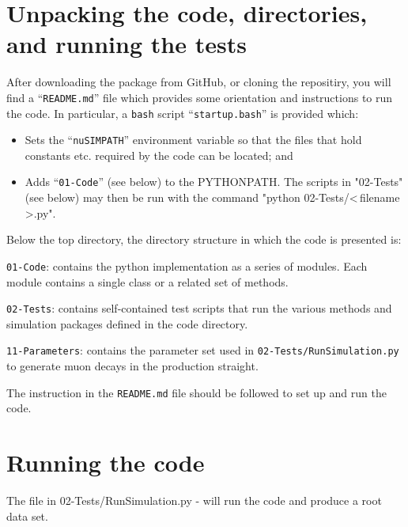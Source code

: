 \section*{Unpacking the code, directories, and running the tests}
After downloading the package from GitHub, or cloning the repositiry,
you will find a ``\verb+README.md+'' file which provides some orientation
and instructions to run the code.
In particular, a \verb+bash+ script ``\verb+startup.bash+'' is
provided which:
\begin{itemize}
  \item Sets the ``\verb+nuSIMPATH+'' environment variable so that the
    files that hold constants etc. required by the code can be
    located; and
  \item Adds ``\verb+01-Code+'' (see below) to the PYTHONPATH.
    The scripts in "02-Tests" (see below) may then be run with the
    command "python 02-Tests/\textless\,filename\,\textgreater.py".
\end{itemize}
Below the top directory, the directory structure in which the code is
presented is:
\begin{description}
  \item\verb+01-Code+: contains the python implementation as a
    series of modules.
    Each module contains a single class or a related set of methods.
  \item\verb+02-Tests+: contains self-contained test scripts that
    run the various methods and simulation packages defined in the
    code directory.
  \item\verb+11-Parameters+: contains the parameter set used in
    \verb+02-Tests/RunSimulation.py+ to generate muon decays in
    the production straight.
\end{description}
The instruction in the \verb+README.md+ file should be followed to set
up and run the code.

\section{Running the code}
The file in 02-Tests/RunSimulation.py - will run the code and produce a root data  set.\newline

